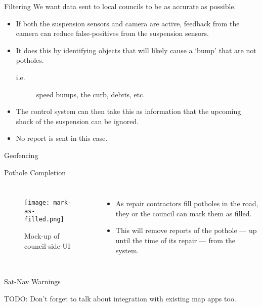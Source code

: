 \documentclass{beamer}
\begin{document}
\begin{frame}{Filtering}
    We want data sent to local councils to be as accurate as possible.
    \begin{itemize}
        \item If both the suspension sensors and camera are active, feedback from the camera can reduce false-positives from the suspension sensors.
        \item It does this by identifying objects that will likely cause a `bump' that are \alert{not} potholes.
        \begin{description}
            \item[i.e.] speed bumps, the curb, debris, etc.
        \end{description}
        \item The control system can then take this as information that the upcoming shock of the suspension can be ignored.
        \item \alert{No} report is sent in this case.
    \end{itemize}
\end{frame}

\begin{frame}{Geofencing}
    
\end{frame}

\begin{frame}{Pothole Completion}
    \begin{columns}

        \begin{figure}
            \texttt{[image: mark-as-filled.png]}
            \caption{Mock-up of council-side UI}
        \end{figure}


        \begin{itemize}
            \item As repair contractors fill potholes in the road, they or the council can mark them as filled.
            \item This will remove reports of the pothole --- up until the time of its repair --- from the system.
        \end{itemize}
    \end{columns}
\end{frame}

\begin{frame}{Sat-Nav Warnings}


    TODO: Don't forget to talk about integration with existing map apps too.
\end{frame}
\end{document}
